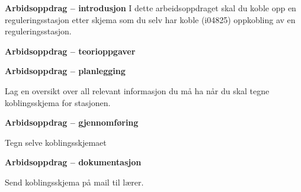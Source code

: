 

\noindent

\vskip 5pt


\textbf{Arbidsoppdrag -- introdusjon}
I dette arbeidsoppdraget skal du koble opp en reguleringsstasjon etter skjema som du selv har koble (i04825) oppkobling av en reguleringsstasjon.

\textbf{Arbidsoppdrag -- teorioppgaver}

\textbf{Arbidsoppdrag -- planlegging}

Lag en oversikt over all relevant informasjon du må ha når du skal tegne koblingsskjema for stasjonen. 

\textbf{Arbidsoppdrag -- gjennomføring}

Tegn selve koblingsskjemaet

\textbf{Arbidsoppdrag -- dokumentasjon}

Send koblingsskjema på mail til lærer. 

















\vfil \eject

















